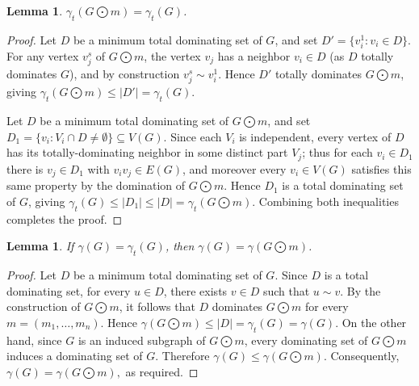 \documentclass[12pt]{amsart}
\theoremstyle{plain}
\newtheorem{lemma}[theorem]{Lemma}
\theoremstyle{definition}
\begin{document}

 
\begin{lemma}\label{Lemma:TD(GammaI)EqualToTD(GammaOm)}
$\gamma_t(G\bigodot m) = \gamma_t(G)$.
\end{lemma}

\begin{proof}
Let $D$ be a minimum total dominating set of $G$, and set $D'=\{v_i^1 : v_i\in D\}$. For any vertex $v_j^s$ of $G\bigodot m$, the vertex $v_j$ has a neighbor $v_i\in D$ (as $D$ totally dominates $G$), and by construction $v_j^s\sim v_i^1$. Hence $D'$ totally dominates $G\bigodot m$, giving $\gamma_t(G\bigodot m)\leq |D'|=\gamma_t(G)$.

Let $D$ be a minimum total dominating set of $G\bigodot m$, and set $D_1=\{v_i : V_i\cap D\neq\emptyset\}\subseteq V(G)$. Since each $V_i$ is independent, every vertex of $D$ has its totally-dominating neighbor in some distinct part $V_j$; thus for each $v_i\in D_1$ there is $v_j\in D_1$ with $v_iv_j\in E(G)$, and moreover every $v_i\in V(G)$ satisfies this same property by the domination of $G\bigodot m$. Hence $D_1$ is a total dominating set of $G$, giving $\gamma_t(G)\leq |D_1|\leq |D|=\gamma_t(G\bigodot m)$.
Combining both inequalities completes the proof.
\end{proof}
\begin{lemma}\label{lemma:dn=tdn-implydn=dn-inmultiplication}
If $\gamma(G)=\gamma_t(G)$, then $\gamma(G)=\gamma(G\bigodot m)$.
\end{lemma}

\begin{proof}
Let $D$ be a minimum total dominating set of $G$. Since $D$ is a total
dominating set, for every $u\in D$, there exists $v\in D$ such that
$u\sim v$. By the construction of $G\bigodot m$, it follows that $D$
dominates $G\bigodot m$ for every $m=(m_1,\ldots,m_n)$. Hence
$\gamma(G\bigodot m)\leq |D|=\gamma_t(G)=\gamma(G).$
On the other hand, since $G$ is an induced subgraph of
$G\bigodot m$, every dominating set of $G\bigodot m$ induces a
dominating set of $G$. Therefore
$\gamma(G)\leq\gamma(G\bigodot m).$
Consequently,
$\gamma(G)=\gamma(G\bigodot m),$
as required.
\end{proof}
\end{document}
